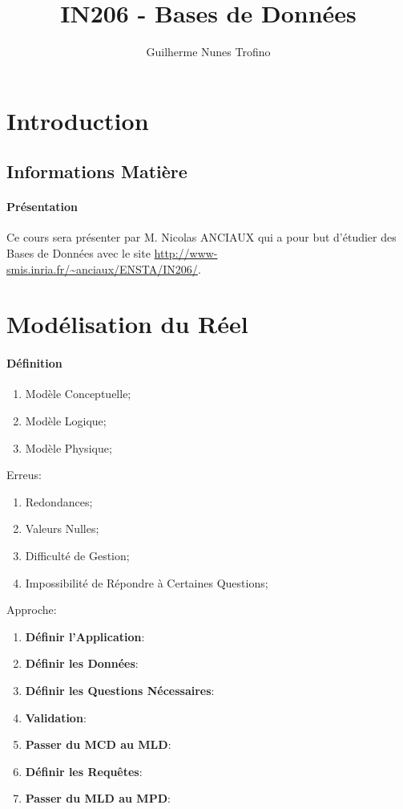 \documentclass{article}
\title{IN206 - Bases de Données}
\author{Guilherme Nunes Trofino}
\begin{document}
\maketitle

\newpage\tableofcontents

\section{Introduction}

% 
% 


\subsection{Informations Matière}
\paragraph{Présentation}Ce cours sera présenter par M. Nicolas ANCIAUX qui a pour but d'étudier des Bases de Données avec le site \url{http://www-smis.inria.fr/~anciaux/ENSTA/IN206/}.

\section{Modélisation du Réel}
\paragraph{Définition}
\begin{enumerate}[noitemsep]
    \item Modèle Conceptuelle;
    \item Modèle Logique;
    \item Modèle Physique;
\end{enumerate}
Erreus:
\begin{enumerate}[noitemsep]
    \item Redondances;
    \item Valeurs Nulles;
    \item Difficulté de Gestion;
    \item Impossibilité de Répondre à Certaines Questions;
\end{enumerate}
Approche:
\begin{enumerate}
    \item \textbf{Définir l'Application}:
    \item \textbf{Définir les Données}:
    \item \textbf{Définir les Questions Nécessaires}:
    \item \textbf{Validation}:
    \item \textbf{Passer du MCD au MLD}:
    \item \textbf{Définir les Requêtes}:
    \item \textbf{Passer du MLD au MPD}:
\end{enumerate}
\end{document}
